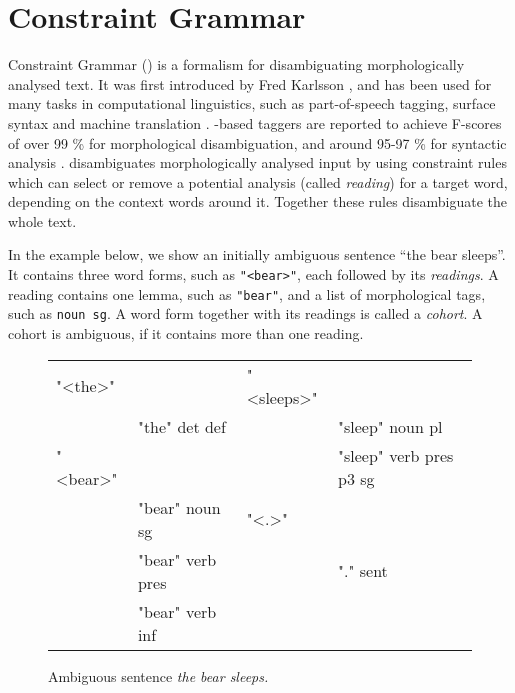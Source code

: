 \newcommand{\quality}[1]{${\tt Quality_{#1}}$}
\newcommand{\kind}[1]{${\tt Kind_{#1}}$}
\newcommand{\very}[1]{${\tt Very_{#1}}$}
\newcommand{\comment}{${\tt Comment}$}
\newcommand{\modFun}[2]{${\tt Mod_{#1,#2}}$}
\newcommand{\predFun}[3]{${\tt Pred_{#1,#2,#3}}$}
\newcommand{\itemSpa}[2]{${\tt Item_{#1,#2}}$}
\newcommand{\itemEng}[1]{${\tt Item_{#1}}$}
\def\t#1{\texttt{#1}}

\section{Constraint Grammar}
\label{sec:cg-intro}

Constraint Grammar (\onlycg{}) is a formalism for 
disambiguating morphologically analysed text. 
It was first introduced by Fred Karlsson  
\cite{karlsson1990cgp,karlsson1995constraint}, and has been used for
many tasks in computational linguistics, such as part-of-speech
tagging, surface syntax and machine translation \cite{bick2011}.
\onlycg{}-based taggers are reported to achieve F-scores of over 99 \% for
morphological disambiguation, and around 95-97 \% for syntactic analysis
\cite{bick2000palavras,bick2003hybridCG_PSG,bick2006spanish}. 
\onlycg{} disambiguates morphologically analysed input by using constraint
rules which can select or remove a potential analysis (called
\emph{reading}) for a target word, depending on the context words
around it.  Together these rules disambiguate the whole text.


In the example below, we show an initially ambiguous sentence ``the bear
sleeps''. 
It contains three word forms, such as \t{"<bear>"}, each followed by its \emph{readings}.
A reading contains one lemma, such as \t{"bear"}, and a list of morphological tags, such as \t{noun sg}.
A word form together with its readings is called a \emph{cohort}. A cohort is ambiguous, if it contains more than one reading.

\begin{figure}[h]
\centering
\ttfamily
\begin{tabular}{p{0.6cm} l  p{0.6cm} l}
"<the>"  &                & "<sleeps>"        \\
    & "the" det def       &     & "sleep" noun pl \\
"<bear>" &                &     & "sleep" verb pres p3 sg \\
    & "bear" noun sg      & "<.>"                   \\
    & "bear" verb pres    &     & "." sent          \\
    & "bear" verb inf \\
\end{tabular}
\label{fig:theBearSleeps}
\caption{Ambiguous sentence {\em the bear sleeps.}}
\end{figure}


